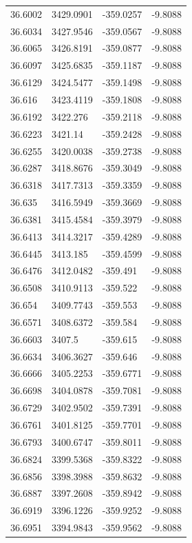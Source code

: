 \begin{table}[H]
\begin{tabular}{llll}
36.6002 & 3429.0901 & -359.0257 & -9.8088 \\
36.6034 & 3427.9546 & -359.0567 & -9.8088 \\
36.6065 & 3426.8191 & -359.0877 & -9.8088 \\
36.6097 & 3425.6835 & -359.1187 & -9.8088 \\
36.6129 & 3424.5477 & -359.1498 & -9.8088 \\
36.616 & 3423.4119 & -359.1808 & -9.8088 \\
36.6192 & 3422.276 & -359.2118 & -9.8088 \\
36.6223 & 3421.14 & -359.2428 & -9.8088 \\
36.6255 & 3420.0038 & -359.2738 & -9.8088 \\
36.6287 & 3418.8676 & -359.3049 & -9.8088 \\
36.6318 & 3417.7313 & -359.3359 & -9.8088 \\
36.635 & 3416.5949 & -359.3669 & -9.8088 \\
36.6381 & 3415.4584 & -359.3979 & -9.8088 \\
36.6413 & 3414.3217 & -359.4289 & -9.8088 \\
36.6445 & 3413.185 & -359.4599 & -9.8088 \\
36.6476 & 3412.0482 & -359.491 & -9.8088 \\
36.6508 & 3410.9113 & -359.522 & -9.8088 \\
36.654 & 3409.7743 & -359.553 & -9.8088 \\
36.6571 & 3408.6372 & -359.584 & -9.8088 \\
36.6603 & 3407.5 & -359.615 & -9.8088 \\
36.6634 & 3406.3627 & -359.646 & -9.8088 \\
36.6666 & 3405.2253 & -359.6771 & -9.8088 \\
36.6698 & 3404.0878 & -359.7081 & -9.8088 \\
36.6729 & 3402.9502 & -359.7391 & -9.8088 \\
36.6761 & 3401.8125 & -359.7701 & -9.8088 \\
36.6793 & 3400.6747 & -359.8011 & -9.8088 \\
36.6824 & 3399.5368 & -359.8322 & -9.8088 \\
36.6856 & 3398.3988 & -359.8632 & -9.8088 \\
36.6887 & 3397.2608 & -359.8942 & -9.8088 \\
36.6919 & 3396.1226 & -359.9252 & -9.8088 \\
36.6951 & 3394.9843 & -359.9562 & -9.8088 \\

\end{tabular}
\end{table}
